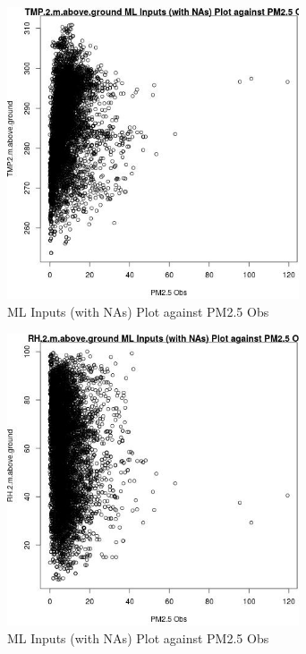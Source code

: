 \begin{figure} 
\centering  
\includegraphics[width=0.77\textwidth]{Code_Outputs/Report_ML_input_PM25_Step4_part_e_de_duplicated_aves_compiled_2019-05-18wNAs_TMP2mabovegroundvPM25_Obs.jpg} 
\caption{\label{fig:Report_ML_input_PM25_Step4_part_e_de_duplicated_aves_compiled_2019-05-18wNAsTMP2mabovegroundvPM25_Obs}ML Inputs (with NAs) Plot against PM2.5 Obs} 
\end{figure} 
 

\begin{figure} 
\centering  
\includegraphics[width=0.77\textwidth]{Code_Outputs/Report_ML_input_PM25_Step4_part_e_de_duplicated_aves_compiled_2019-05-18wNAs_RH2mabovegroundvPM25_Obs.jpg} 
\caption{\label{fig:Report_ML_input_PM25_Step4_part_e_de_duplicated_aves_compiled_2019-05-18wNAsRH2mabovegroundvPM25_Obs}ML Inputs (with NAs) Plot against PM2.5 Obs} 
\end{figure} 
 


